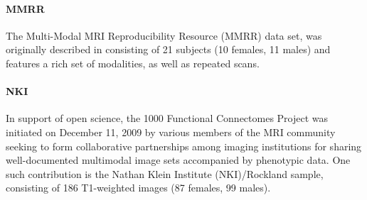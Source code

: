 
\paragraph{MMRR}
The Multi-Modal MRI Reproducibility Resource (MMRR)
data set, was originally described in \cite{landman2011} consisting of 
21 subjects (10 females, 11 males) and features a rich set of modalities, 
as well as repeated scans.


\paragraph{NKI}
In support of open science, the 1000 Functional Connectomes Project
was initiated on December 11, 2009 by various members of the MRI community
seeking to form collaborative partnerships among imaging institutions for
sharing well-documented multimodal image sets accompanied by phenotypic data.
One such contribution is the Nathan Klein Institute (NKI)/Rockland sample,
consisting of 186 T1-weighted
images (87 females, 99 males).%


